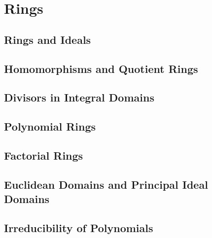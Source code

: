 
\chapter{Rings}\label{cha:rings}
\section{Rings and Ideals}
\section{Homomorphisms and Quotient Rings}
\section{Divisors in Integral Domains}
\section{Polynomial Rings}
\section{Factorial Rings}
\section{Euclidean Domains and Principal Ideal Domains}
\section{Irreducibility of Polynomials}
